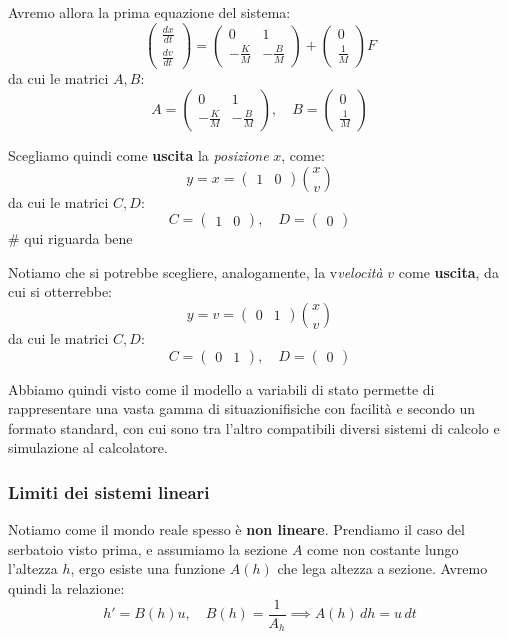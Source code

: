 \documentclass[a4paper,11pt]{article}
\begin{document}
Avremo allora la prima equazione del sistema:
$$
\begin{pmatrix}
	\frac{dx}{dt} \\ 
	\frac{dv}{dt}
\end{pmatrix}
=
\begin{pmatrix}
	0 & 1 \\ 
	-\frac{K}{M} & -\frac{B}{M}
\end{pmatrix}
+
\begin{pmatrix}
	0 \\ 
	\frac{1}{M}
\end{pmatrix}
F
$$
da cui le matrici $A, B$:
$$
A = 
\begin{pmatrix}
	0 & 1 \\ 
	-\frac{K}{M} & -\frac{B}{M}
\end{pmatrix}, \quad 
B = 
\begin{pmatrix}
	0 \\ 
	\frac{1}{M}
\end{pmatrix}
$$

Scegliamo quindi come \textbf{uscita} la \textit{posizione} $x$, come:
$$
y = x = 
\begin{pmatrix}
	1 & 0
\end{pmatrix}
 \binom{x}{v}
$$
da cui le matrici $C, D$:
$$
C =
\begin{pmatrix}
	1 & 0
\end{pmatrix}, \quad 
D =
\begin{pmatrix}
0
\end{pmatrix}
$$ 
# qui riguarda bene

Notiamo che si potrebbe scegliere, analogamente, la v\textit{velocità} $v$ come \textbf{uscita}, da cui si otterrebbe:
$$
y = v = 
\begin{pmatrix}
	0 & 1
\end{pmatrix}
 \binom{x}{v}
$$
da cui le matrici $C, D$:
$$
C =
\begin{pmatrix}
	0 & 1
\end{pmatrix}, \quad 
D =
\begin{pmatrix}
0
\end{pmatrix}
$$

\par\medskip 

Abbiamo quindi visto come il modello a variabili di stato permette di rappresentare una vasta gamma di situazionifisiche con facilità e secondo un formato standard, con cui sono tra l'altro compatibili diversi sistemi di calcolo e simulazione al calcolatore.

\subsubsection{Limiti dei sistemi lineari}
Notiamo come il mondo reale spesso è \textbf{non lineare}.
Prendiamo il caso del serbatoio visto prima, e assumiamo la sezione $A$ come non costante lungo l'altezza $h$, ergo esiste una funzione $A(h)$ che lega altezza a sezione.
Avremo quindi la relazione:
$$
h' = B(h) u, \quad B(h) = \frac{1}{A_h} \implies A(h) \, dh = u \, dt
$$
\end{document}
